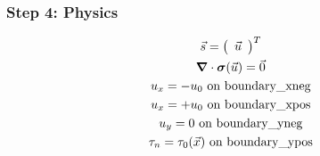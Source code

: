 \documentclass[aspectratio=169]{beamer}
\begin{document}
\begin{frame}
  \frametitle{Step 4: Physics}
  \summary{}

  \begin{minipage}{0.3\textwidth}
    {\scriptsize
      \begin{gather*}
        \vec{s} = \left(\begin{array}{c} \vec{u} \end{array}\right)^T \\
        \bm{\nabla} \cdot \bm{\sigma}(\vec{u}) = \vec{0} \\
        u_x = -u_0 \text{ on boundary\_xneg} \\
        u_x = +u_0 \text{ on boundary\_xpos} \\
        u_y = 0 \text{ on boundary\_yneg} \\
        \tau_n = \tau_0(\vec{x}) \text{ on boundary\_ypos}
    \end{gather*}}
  \end{minipage}
  \hfill
  \begin{minipage}{0.67\textwidth}
  \end{minipage}
      
\end{frame}
\end{document}
